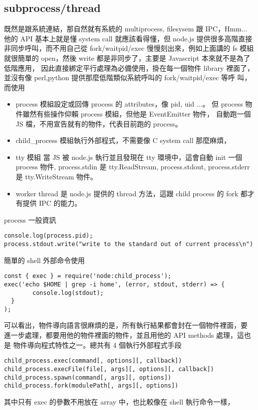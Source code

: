   \subsection{subprocess/thread}
  既然是跟系統連結，那自然就有系統的 multiprocess, filesysem 跟 IPC，Hmm...
  他的 API 基本上就是懂 system call 就應該看得懂，但 node.js 提供很多高階直接
  非同步呼叫，而不用自己從 fork/waitpid/exec 慢慢刻出來，例如上面講的 fs 模組
  就很簡單的 open，然後 write 都是非同步了，主要是 Javascript 本來就不是為了
  低階應用， 因此直接綁定平行處理為必備使用，掛在每一個物件 library 裡面了，
  並沒有像 perl,python 提供那麼低階類似系統呼叫的 fork/waitpid/exec 等呼
  叫，而使用
  \begin{itemize}
    \item process 模組設定或回傳 process 的 attributes，像 pid, uid ...。
      但 process 物件雖然有些操作仰賴 process 模組，但他是 EventEmitter 物件，
      自動跑一個 JS 檔，不用宣告就有的物件，代表目前跑的 process。
    \item child\_process 模組執行外部程式，不需要像 C system call 那麼麻煩，
    \item tty 模組 當 JS 被 node.js 執行並且發現在 tty 環境中，這會自動 init
      一個 process 物件, process.stdin 是 tty.ReadStream, process.stdout,
      process.stderr 是 tty.WriteStream 物件。
    \item worker thread 是 node.js 提供的 thread 方法，這跟 child process 的
      fork 都才有提供 IPC 的能力。
  \end{itemize}
  process 一般資訊
  \begin{verbatim}
console.log(process.pid);
process.stdout.write("write to the standard out of current process\n")
  \end{verbatim}
  簡單的 shell 外部命令使用
  \begin{verbatim}
const { exec } = require('node:child_process');
exec('echo $HOME | grep -i home', (error, stdout, stderr) => {
        console.log(stdout);
  }
);
  \end{verbatim}
  可以看出，物件導向語言很麻煩的是，所有執行結果都會封在一個物件裡面，要
  進一步處理，都要用他的物件裡面的物件，並且用他的 API methods 處理，這也是
  物件導向程式特性之一。總共有 4 個執行外部程式手段
  \begin{verbatim}
child_process.exec(command[, options][, callback])
child_process.execFile(file[, args][, options][, callback])
child_process.spawn(command[, args][, options])
child_process.fork(modulePath[, args][, options])
  \end{verbatim}
  其中只有 exec 的參數不用放在 array 中，也比較像在 shell 執行命令一樣，
